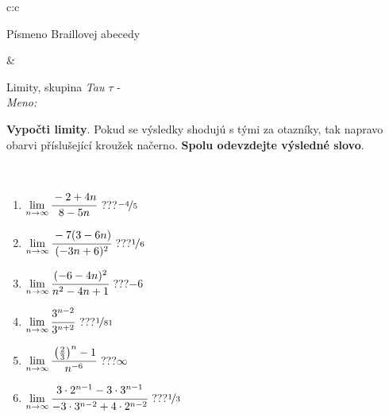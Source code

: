 \documentclass[10pt]{report}
\begin{document}
\begin{tabular}{c:c}
\begin{minipage}[c][104.5mm][t]{0.5\linewidth}
\begin{center}
\begin{minipage}{0.20\linewidth}
\begin{center}
{\small Písmeno Braillovej abecedy}
\end{center}
\end{minipage}
\end{center}
\end{minipage}
&
\begin{minipage}[c][104.5mm][t]{0.5\linewidth}
\begin{center}
\vspace{7mm}
{\huge Limity, skupina \textit{Tau $\tau$} -}\\[5mm]
\textit{Meno:}\phantom{xxxxxxxxxxxxxxxxxxxxxxxxxxxxxxxxxxxxxxxxxxxxxxxxxxxxxxxxxxxxxxxxx}\\[5mm]
\begin{minipage}{0.95\linewidth}
\begin{center}
\textbf{Vypočti limity}. Pokud se výsledky shodujú s tými za otazníky, tak napravo\\obarvi příslušející kroužek načerno. \textbf{Spolu odevzdejte výsledné slovo}.
\end{center}
\end{minipage}
\\[1mm]
\begin{minipage}{0.79\linewidth}
\begin{center}
\begin{varwidth}{\linewidth}
\begin{enumerate}
\normalsize
\item $\lim\limits_{n\to\infty}\cfrac{-2+4n}{8-5n}$\quad \dotfill\; ???\;\dotfill \quad $\nicefrac{-4}{5}$
\item $\lim\limits_{n\to\infty}\cfrac{-7(3-6n)}{(-3n+6)^2}$\quad \dotfill\; ???\;\dotfill \quad $\nicefrac{1}{6}$
\item $\lim\limits_{n\to\infty}\cfrac{(-6-4n)^2}{n^2-4n+1}$\quad \dotfill\; ???\;\dotfill \quad $-6$
\item $\lim\limits_{n\to\infty}\cfrac{3^{n-2}}{3^{n+2}}$\quad \dotfill\; ???\;\dotfill \quad $\nicefrac{1}{81}$
\item $\lim\limits_{n\to\infty}\cfrac{\left(\frac{2}{3}\right)^n -1}{n^{-6}}$\quad \dotfill\; ???\;\dotfill \quad $\infty$
\item $\lim\limits_{n\to\infty}\cfrac{3\cdot 2^{n-1}-3\cdot 3^{n-1}}{-3\cdot 3^{n-2}+4\cdot 2^{n-2}}$\quad \dotfill\; ???\;\dotfill \quad $\nicefrac{1}{3}$
\end{enumerate}
\end{varwidth}
\end{center}
\end{minipage}

\end{center}
\end{minipage}
\end{tabular}
\end{document}
